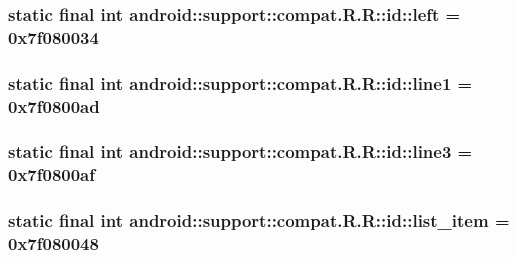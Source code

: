 \hypertarget{classandroid_1_1support_1_1compat_1_1_r_1_1id_a73be5b0bdce9835035590539c9b5069}{
\subsubsection[{left}]{\setlength{\rightskip}{0pt plus 5cm}static final int android::support::compat.R.R::id::left = 0x7f080034}}
\label{classandroid_1_1support_1_1compat_1_1_r_1_1id_a73be5b0bdce9835035590539c9b5069}


\hypertarget{classandroid_1_1support_1_1compat_1_1_r_1_1id_9daef3d11c03557777cba8bece100202}{
\subsubsection[{line1}]{\setlength{\rightskip}{0pt plus 5cm}static final int android::support::compat.R.R::id::line1 = 0x7f0800ad}}
\label{classandroid_1_1support_1_1compat_1_1_r_1_1id_9daef3d11c03557777cba8bece100202}


\hypertarget{classandroid_1_1support_1_1compat_1_1_r_1_1id_0c6df14a3b730b4472f3ffccd093baad}{
\subsubsection[{line3}]{\setlength{\rightskip}{0pt plus 5cm}static final int android::support::compat.R.R::id::line3 = 0x7f0800af}}
\label{classandroid_1_1support_1_1compat_1_1_r_1_1id_0c6df14a3b730b4472f3ffccd093baad}


\hypertarget{classandroid_1_1support_1_1compat_1_1_r_1_1id_64293aaab17683c48154e2b4dc6e179c}{
\subsubsection[{list\_\-item}]{\setlength{\rightskip}{0pt plus 5cm}static final int android::support::compat.R.R::id::list\_\-item = 0x7f080048}}
\label{classandroid_1_1support_1_1compat_1_1_r_1_1id_64293aaab17683c48154e2b4dc6e179c}


